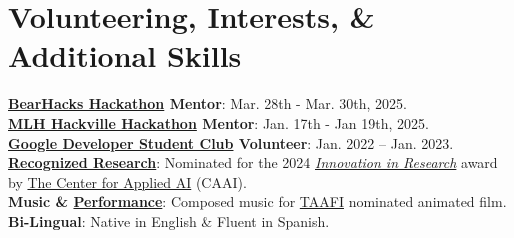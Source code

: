 \documentclass[letterpaper,11pt]{article}
\begin{document}
\section{Volunteering, Interests, \& Additional Skills}
 \begin{itemize}[leftmargin=0.15in, label={}]
    \small{\item{
    \textbf{\href{https://bearhacks2025.devpost.com/}{BearHacks Hackathon} Mentor}{: Mar. 28th - Mar. 30th, 2025.} \\
     \textbf{\href{https://www.hackville.io/}{MLH Hackville Hackathon} Mentor}{: Jan. 17th - Jan 19th, 2025.} \\
     \textbf{\href{https://gdg.community.dev/gdg-on-campus-sheridan-college-trafalgar-road-campus-oakville-canada/}{{Google Developer Student Club}} Volunteer}{: Jan. 2022 – Jan. 2023.} \\
     \textbf{\href{https://www.linkedin.com/posts/adolfo-david-romero_research-innovation-studentawards-activity-7228852749797396480-1Qj9?utm_source=share&utm_medium=member_desktop}{Recognized Research}}{: Nominated for the 2024 \href{https://www.sheridancollege.ca/newsroom/articles/research-scholarship/2024-generator-student-awards}{\emph{Innovation in Research}} award by \href{https://www.sheridancollege.ca/research/centres/applied-ai}{The Center for Applied AI} (CAAI).}\\
     \textbf{{Music} \& {\href{https://youtu.be/riCd8ONRqcU?si=FA0FkaM_xm9Em67O}{Performance}}}{: Composed music for \href{https://taafi.com/}{TAAFI} nominated animated film.} \\
     \textbf{Bi-Lingual}{: Native in English \& Fluent in Spanish.} \\
    }}
 \end{itemize}

\end{document}

